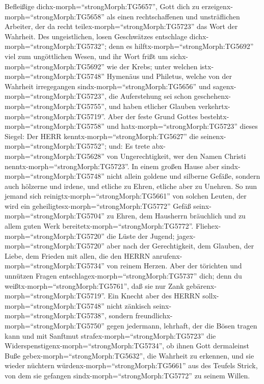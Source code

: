  Befleißige dichx-morph=``strongMorph:TG5657'', Gott dich
zu erzeigenx-morph=``strongMorph:TG5658'' als einen rechtschaffenen und
unsträflichen Arbeiter, der da recht teilex-morph=``strongMorph:TG5723''
das Wort der Wahrheit.  Des ungeistlichen, losen
Geschwätzes entschlage dichx-morph=``strongMorph:TG5732''; denn es
hilftx-morph=``strongMorph:TG5692'' viel zum ungöttlichen Wesen,
 und ihr Wort frißt um sichx-morph=``strongMorph:TG5692''
wie der Krebs; unter welchen istx-morph=``strongMorph:TG5748'' Hymenäus
und Philetus,  welche von der Wahrheit irregegangen
sindx-morph=``strongMorph:TG5656'' und
sagenx-morph=``strongMorph:TG5723'', die Auferstehung sei schon
geschehenx-morph=``strongMorph:TG5755'', und haben etlicher Glauben
verkehrtx-morph=``strongMorph:TG5719''.  Aber der feste
Grund Gottes bestehtx-morph=``strongMorph:TG5758'' und
hatx-morph=``strongMorph:TG5723'' dieses Siegel: Der HERR
kenntx-morph=``strongMorph:TG5627'' die
seinenx-morph=``strongMorph:TG5752''; und: Es trete
abx-morph=``strongMorph:TG5628'' von Ungerechtigkeit, wer den Namen
Christi nenntx-morph=``strongMorph:TG5723''.  In einem
großen Hause aber sindx-morph=``strongMorph:TG5748'' nicht allein
goldene und silberne Gefäße, sondern auch hölzerne und irdene, und
etliche zu Ehren, etliche aber zu Unehren.  So nun jemand
sich reinigtx-morph=``strongMorph:TG5661'' von solchen Leuten, der wird
ein geheiligtesx-morph=``strongMorph:TG5772'' Gefäß
seinx-morph=``strongMorph:TG5704'' zu Ehren, dem Hausherrn bräuchlich
und zu allem guten Werk bereitetx-morph=``strongMorph:TG5772''.
 Fliehex-morph=``strongMorph:TG5720'' die Lüste der Jugend;
jagex-morph=``strongMorph:TG5720'' aber nach der Gerechtigkeit, dem
Glauben, der Liebe, dem Frieden mit allen, die den HERRN
anrufenx-morph=``strongMorph:TG5734'' von reinem Herzen. 
Aber der törichten und unnützen Fragen
entschlagex-morph=``strongMorph:TG5737'' dich; denn du
weißtx-morph=``strongMorph:TG5761'', daß sie nur Zank
gebärenx-morph=``strongMorph:TG5719''.  Ein Knecht aber des
HERRN sollx-morph=``strongMorph:TG5748'' nicht zänkisch
seinx-morph=``strongMorph:TG5738'', sondern
freundlichx-morph=``strongMorph:TG5750'' gegen jedermann, lehrhaft, der
die Bösen tragen kann  und mit Sanftmut
strafex-morph=``strongMorph:TG5723'' die
Widerspenstigenx-morph=``strongMorph:TG5734'', ob ihnen Gott dermaleinst
Buße gebex-morph=``strongMorph:TG5632'', die Wahrheit zu erkennen,
 und sie wieder nüchtern
würdenx-morph=``strongMorph:TG5661'' aus des Teufels Strick, von dem sie
gefangen sindx-morph=``strongMorph:TG5772'' zu seinem Willen.

